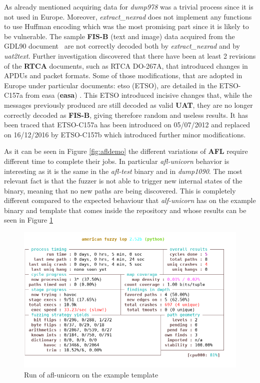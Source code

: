 \documentclass[../main.tex]{subfiles}
\begin{document}
As already mentioned acquiring data for \textit{dump978} was a trivial process since it is not used in Europe. Moreover, \textit{extract\_nexrad} does not implement any functions to use Huffman encoding which was the most promising part since it is likely to be vulnerable. The sample \textbf{FIS-B} (text and image) data acquired from the GDL90 document~\cite{gdl90} are not correctly decoded both by \textit{extract\_nexrad} and by \textit{uat2text}. Further investigation discovered that there have been at least 2 revisions of the \textbf{RTCA} documents, such as RTCA DO-267A, that introduced changes in APDUs and packet formats. Some of those modifications, that are adopted in Europe under particular documents: \acrlong{etso} (ETSO), are detailed in the ETSO-C157a from \acrlong{easa} (\textbf{\acrshort{easa}}) \cite{easa-all-etso}.
This ETSO introduced incisive changes that, while the messages previously produced are still decoded as valid \textbf{UAT}, they are no longer correctly decoded as \textbf{FIS-B}, giving therefore random and useless results.
It has been traced that ETSO-C157a has been introduced on 05/07/2012 and replaced on 16/12/2016 by ETSO-C157b which introduced further minor modifications.

\bigskip


As it can be seen in Figure \ref{fig:afldemo} the different variations of \textbf{AFL} require different time to complete their jobs. In particular \textit{afl-unicorn} behavior is interesting as it is the same in the \textit{afl-test} binary and in \textit{dump1090}. The most relevant fact is that the fuzzer is not able to trigger new internal states of the binary, meaning that no new paths are being discovered. This is completely different compared to the expected behaviour that \textit{alf-unicorn} has on the example binary and template that comes inside the repository and whose results can be seen in Figure \ref{fig:aflunicornres}

\begin{figure}[htp]
  \centering
  \includegraphics[scale=0.75]{images/afl-unicorn-sample.png}
  \caption{Run of afl-unicorn on the example template}
  \label{fig:aflunicornres}
\end{figure}
\end{document}
